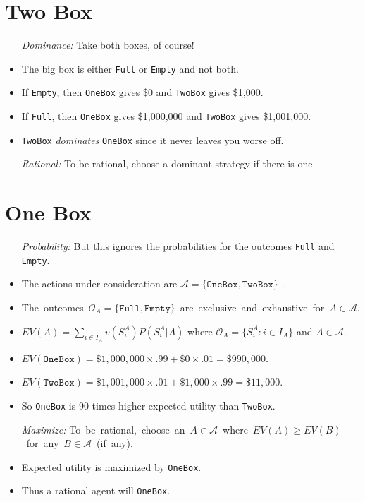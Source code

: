 \documentclass[a4paper, 11pt]{article} %
\newcommand{\set}[1]{\lbrace#1\rbrace} %
\renewcommand{\O}{\mathcal{O}}
\newcommand{\A}{\mathcal{A}}
\begin{document}
\section*{Two Box}

\begin{itemize}
  \item[\it Dominance:] Take both boxes, of course!
    \item The big box is either \texttt{Full} or \texttt{Empty} and not both.
    \item If \texttt{Empty}, then \texttt{OneBox} gives \$0 and \texttt{TwoBox} gives \$1,000.
    \item If \texttt{Full}, then \texttt{OneBox} gives \$1,000,000 and \texttt{TwoBox} gives \$1,001,000.
    \item \texttt{TwoBox} \textit{dominates} \texttt{OneBox} since it never leaves you worse off.
  \item[\it Rational:] To be rational, choose a dominant strategy if there is one.
\end{itemize}




\section*{One Box}

\begin{itemize}
  \item[\it Probability:] But this ignores the probabilities for the outcomes \texttt{Full} and \texttt{Empty}.
    \item The actions under consideration are $\A = \set{\texttt{OneBox}, \texttt{TwoBox}}$ .
    \item \mbox{The outcomes $\O_A = \set{\texttt{Full},\texttt{Empty}}$ are exclusive and exhaustive for $A \in \A$.} 
    \item $EV(A) = \sum\limits_{i \in I_A} v(S_i^A)P(S_i^A|A)$ where $\O_A = \set{S_i^A: i \in I_A}$ and $A \in \A$.
    \item $EV(\texttt{OneBox})=\$1,000,000\times.99 + \$0\times.01 = \$990,000$.
    \item $EV(\texttt{TwoBox})=\$1,001,000\times.01 + \$1,000\times.99 = \$11,000$.
    \item So \texttt{OneBox} is 90 times higher expected utility than \texttt{TwoBox}.
  \item[\it Maximize:] \mbox{To be rational, choose an $A \in \A$ where $EV(A) \geq EV(B)$ for any $B \in \A$ (if any).}  
    \item Expected utility is maximized by \texttt{OneBox}.
    \item Thus a rational agent will \texttt{OneBox}.
\end{itemize}
\end{document}
